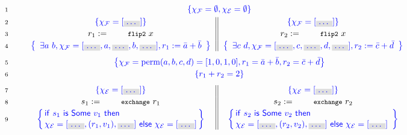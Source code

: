 \begin{figure*}
\centering
{\small{
\[
\begin{tabular}{r@{\ \ \ \ \ \ \ \ }c || c}
\Num{1} & \multicolumn{2}{c}{\specK{\{\hist_{\cal F} = \emptyset,  \hist_{\cal E} = \emptyset\}}}
\\[3pt]
\Num{2} & \specK{\{\hist_{\cal F} = [\graybox{\ldots}] \}}
&
\specK{\{\hist_{\cal F} = [\graybox{\ldots}] \}}
\\[2pt]
\Num{3} & $r_1 := \esc{flip2}~x$ & $r_2 := \esc{flip2}~x$
\\[2pt]
\Num{4} & \spec{
  \begin{array}{c}
    \exists a~b,
   \hist_{\cal F} = [\graybox{\ldots}, a, \graybox{\ldots}, b,
    \graybox{\ldots}], 
    r_1 := \bar{a} + \bar{b}
  \end{array}
}
&
\spec{
  \begin{array}{c}
    \exists c~d,
   \hist_{\cal F} = [\graybox{\ldots}, c, \graybox{\ldots}, d,
    \graybox{\ldots}], 
    r_2 := \bar{c} + \bar{d}
  \end{array}
}
\\ & \multicolumn{2}{c}{}\\[-5pt]
\Num{5} & \multicolumn{2}{c}{\spec{\hist_{\cal F} = \text{perm}(a, b, c, d) = [1, 0,
  1, 0], r_1 = \bar{a} + \bar{b}, r_2 = \bar{c} + \bar{d}}}
\\[2pt]
\Num{6} & \multicolumn{2}{c}{\spec{r_1 + r_2 = 2}}
\\ & \multicolumn{2}{c}{}\\[-5pt]
%
%
\Num{7} &
\specK{\{\hist_{\cal E} = [\graybox{\ldots}] \}} & 
\specK{\{\hist_{\cal E} = [\graybox{\ldots}] \}}
\\[2pt]
\Num{8} & $s_1 := \esc{exchange}~r_1$ & $s_2 := \esc{exchange}~r_2$
\\[2pt]
\Num{9} & 
  \spec{\!\!
  \begin{array}{l}
    \mathsf{if}\ s_1\ \mathsf{is}\ \mathsf{Some}\ v_1\ \mathsf{then}~\\[1pt]
    \hist_{\cal E} = [\graybox{\ldots}, (r_1, v_1), \graybox{\ldots}]
    ~\mathsf{else}\ \hist_{\cal E} = [\graybox{\ldots}]
  \end{array}
  \!\!}
&
  \spec{\!\!
  \begin{array}{l}
    \mathsf{if}\ s_2\ \mathsf{is}\ \mathsf{Some}\ v_2\ \mathsf{then}~\\[1pt]
    \hist_{\cal E} = [\graybox{\ldots}, (r_2, v_2), \graybox{\ldots}]
    ~\mathsf{else}\ \hist_{\cal E} = [\graybox{\ldots}]
  \end{array}
}
\end{tabular}\]}}
\end{figure*}
